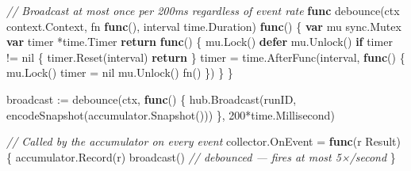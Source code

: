 \documentclass[
]{article}
\newenvironment{Shaded}{}{}
\newcommand{\CommentTok}[1]{\textcolor[rgb]{0.38,0.63,0.69}{\textit{#1}}}
\newcommand{\ControlFlowTok}[1]{\textcolor[rgb]{0.00,0.44,0.13}{\textbf{#1}}}
\newcommand{\DecValTok}[1]{\textcolor[rgb]{0.25,0.63,0.44}{#1}}
\newcommand{\KeywordTok}[1]{\textcolor[rgb]{0.00,0.44,0.13}{\textbf{#1}}}
\newcommand{\NormalTok}[1]{#1}
\newcommand{\OperatorTok}[1]{\textcolor[rgb]{0.40,0.40,0.40}{#1}}
\newcommand{\OtherTok}[1]{\textcolor[rgb]{0.00,0.44,0.13}{#1}}
\begin{document}
\begin{Shaded}
\begin{Highlighting}[]
\CommentTok{// Broadcast at most once per 200ms regardless of event rate}
\KeywordTok{func}\NormalTok{ debounce}\OperatorTok{(}\NormalTok{ctx context}\OperatorTok{.}\NormalTok{Context}\OperatorTok{,}\NormalTok{ fn }\KeywordTok{func}\OperatorTok{(),}\NormalTok{ interval time}\OperatorTok{.}\NormalTok{Duration}\OperatorTok{)} \KeywordTok{func}\OperatorTok{()} \OperatorTok{\{}
    \KeywordTok{var}\NormalTok{ mu sync}\OperatorTok{.}\NormalTok{Mutex}
    \KeywordTok{var}\NormalTok{ timer }\OperatorTok{*}\NormalTok{time}\OperatorTok{.}\NormalTok{Timer}
    \ControlFlowTok{return} \KeywordTok{func}\OperatorTok{()} \OperatorTok{\{}
\NormalTok{        mu}\OperatorTok{.}\NormalTok{Lock}\OperatorTok{()}
        \ControlFlowTok{defer}\NormalTok{ mu}\OperatorTok{.}\NormalTok{Unlock}\OperatorTok{()}
        \ControlFlowTok{if}\NormalTok{ timer }\OperatorTok{!=} \OtherTok{nil} \OperatorTok{\{}
\NormalTok{            timer}\OperatorTok{.}\NormalTok{Reset}\OperatorTok{(}\NormalTok{interval}\OperatorTok{)}
            \ControlFlowTok{return}
        \OperatorTok{\}}
\NormalTok{        timer }\OperatorTok{=}\NormalTok{ time}\OperatorTok{.}\NormalTok{AfterFunc}\OperatorTok{(}\NormalTok{interval}\OperatorTok{,} \KeywordTok{func}\OperatorTok{()} \OperatorTok{\{}
\NormalTok{            mu}\OperatorTok{.}\NormalTok{Lock}\OperatorTok{()}
\NormalTok{            timer }\OperatorTok{=} \OtherTok{nil}
\NormalTok{            mu}\OperatorTok{.}\NormalTok{Unlock}\OperatorTok{()}
\NormalTok{            fn}\OperatorTok{()}
        \OperatorTok{\})}
    \OperatorTok{\}}
\OperatorTok{\}}

\NormalTok{broadcast }\OperatorTok{:=}\NormalTok{ debounce}\OperatorTok{(}\NormalTok{ctx}\OperatorTok{,} \KeywordTok{func}\OperatorTok{()} \OperatorTok{\{}
\NormalTok{    hub}\OperatorTok{.}\NormalTok{Broadcast}\OperatorTok{(}\NormalTok{runID}\OperatorTok{,}\NormalTok{ encodeSnapshot}\OperatorTok{(}\NormalTok{accumulator}\OperatorTok{.}\NormalTok{Snapshot}\OperatorTok{()))}
\OperatorTok{\},} \DecValTok{200}\OperatorTok{*}\NormalTok{time}\OperatorTok{.}\NormalTok{Millisecond}\OperatorTok{)}

\CommentTok{// Called by the accumulator on every event}
\NormalTok{collector}\OperatorTok{.}\NormalTok{OnEvent }\OperatorTok{=} \KeywordTok{func}\OperatorTok{(}\NormalTok{r Result}\OperatorTok{)} \OperatorTok{\{}
\NormalTok{    accumulator}\OperatorTok{.}\NormalTok{Record}\OperatorTok{(}\NormalTok{r}\OperatorTok{)}
\NormalTok{    broadcast}\OperatorTok{()} \CommentTok{// debounced — fires at most 5×/second}
\OperatorTok{\}}
\end{Highlighting}
\end{Shaded}
\end{document}
